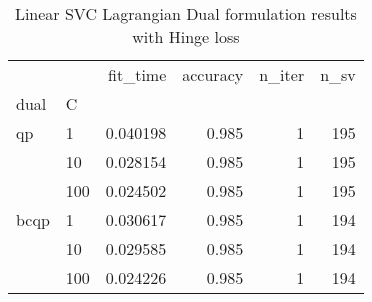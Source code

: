 \begin{table}[H]
\centering
\caption{Linear SVC Lagrangian Dual formulation results with Hinge loss}
\label{linear_lagrangian_dual_svc_cv_results}
\begin{tabular}{llrrrr}
\toprule
     &     &  fit\_time &  accuracy &  n\_iter &  n\_sv \\
dual & C &           &           &         &       \\
\midrule
qp & 1   &  0.040198 &     0.985 &       1 &   195 \\
     & 10  &  0.028154 &     0.985 &       1 &   195 \\
     & 100 &  0.024502 &     0.985 &       1 &   195 \\
bcqp & 1   &  0.030617 &     0.985 &       1 &   194 \\
     & 10  &  0.029585 &     0.985 &       1 &   194 \\
     & 100 &  0.024226 &     0.985 &       1 &   194 \\
\bottomrule
\end{tabular}
\end{table}
